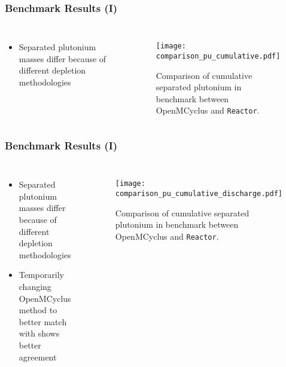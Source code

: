 \begin{frame}
    \frametitle{Benchmark Results (I)}
    \begin{columns}
        \column[t]{3.5cm}
        \begin{itemize}
            \item Separated plutonium masses differ because of 
                  different depletion methodologies
        \end{itemize}
        \column[t]{6.5cm}
        \begin{figure}
            \centering 
            \texttt{[image: comparison\_pu\_cumulative.pdf]}
            \caption{Comparison of cumulative separated plutonium in benchmark between 
            OpenMCyclus and \Cycamore \texttt{Reactor}.}
        \end{figure}
    \end{columns}
\end{frame}

\begin{frame}
    \frametitle{Benchmark Results (I)}
    \begin{columns}
        \column[t]{3.5cm}
        \begin{itemize}
            \item Separated plutonium masses differ because of 
                  different depletion methodologies
            \item Temporarily changing OpenMCyclus method to better 
                  match with \Cycamore shows better agreement
        \end{itemize}
        \column[t]{6.5cm}
        \begin{figure}
            \centering 
            \texttt{[image: comparison\_pu\_cumulative\_discharge.pdf]}
            \caption{Comparison of cumulative separated plutonium in benchmark between 
            OpenMCyclus and \Cycamore \texttt{Reactor}.}
        \end{figure}
    \end{columns}
\end{frame}

